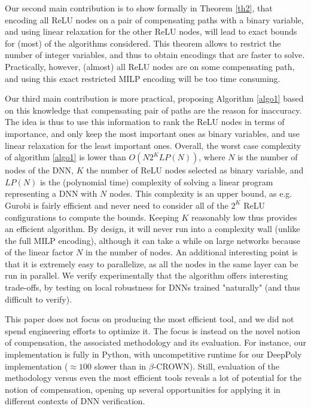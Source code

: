 Our second main contribution is to show formally in Theorem \ref{th2}, that 
encoding all ReLU nodes on a pair of compensating paths with a binary variable,
and using linear relaxation for the other ReLU nodes, will lead to exact bounds for (most) of the algorithms considered. This theorem allows to restrict the number of integer variables, and thus to obtain encodings that are faster to solve. Practically, however, (almost) all ReLU nodes are on some compensating path, and using this exact restricted MILP encoding will be too time consuming.

Our third main contribution is more practical, proposing Algorithm \ref{algo1} based on this knowledge that compensating pair of paths are the reason for inaccuracy. The idea is thus to use this information to rank the ReLU nodes in terms of importance, and only keep the most important ones as binary variables, and use linear relaxation for the least important ones.
Overall, the worst case complexity of algorithm \ref{algo1} is lower than $O(N 2^K LP(N))$, where $N$ is the number of nodes of the DNN, $K$ the number of ReLU nodes selected as binary variable, and $LP(N)$ is the (polynomial time) complexity of solving a linear program representing a DNN with $N$ nodes. This complexity is an upper bound, as e.g. Gurobi is fairly efficient and never need to consider all of the $2^K$ ReLU configurations to compute the bounds. Keeping $K$ reasonably low thus provides an efficient algorithm. 
By design, it will never run into a complexity wall (unlike the full MILP encoding), although it can take a while on large networks because of the linear factor $N$ in the number of nodes. An additional interesting point is that it is extremely easy to parallelize, as all the nodes in the same layer can be run in parallel. We verify experimentally that the algorithm offers interesting trade-offs, by testing on local robustness for DNNs trained "naturally" (and thus difficult to verify).

This paper does not focus on producing the most efficient tool, and we did not spend engineering efforts to optimize it. The focus is instead on the novel notion of compensation, the associated methodology and its evaluation. For instance, our implementation is fully in Python, with uncompetitive runtime for our DeepPoly implementation ($\approx 100$ slower than in $\beta$-CROWN). Still, evaluation of the methodology versus even the most efficient tools reveals a lot of potential for the notion of compensation, opening up several opportunities for applying it in different contexts of DNN verification. 

